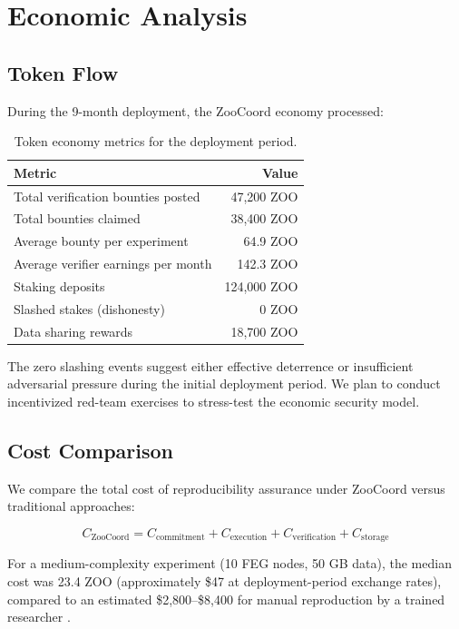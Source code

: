 \section{Economic Analysis}

\label{sec:economics}

\subsection{Token Flow}

During the 9-month deployment, the ZooCoord economy processed:

\begin{table}[H]
\centering
\caption{Token economy metrics for the deployment period.}
\label{tab:economics}
\begin{tabular}{@{}lr@{}}
\toprule
\textbf{Metric} & \textbf{Value} \\
\midrule
Total verification bounties posted & 47,200 ZOO \\
Total bounties claimed & 38,400 ZOO \\
Average bounty per experiment & 64.9 ZOO \\
Average verifier earnings per month & 142.3 ZOO \\
Staking deposits & 124,000 ZOO \\
Slashed stakes (dishonesty) & 0 ZOO \\
Data sharing rewards & 18,700 ZOO \\
\bottomrule
\end{tabular}
\end{table}

The zero slashing events suggest either effective deterrence or insufficient adversarial pressure during the initial deployment period.
We plan to conduct incentivized red-team exercises to stress-test the economic security model.

\subsection{Cost Comparison}

We compare the total cost of reproducibility assurance under ZooCoord versus traditional approaches:

\begin{equation}
    C_{\text{ZooCoord}} = C_{\text{commitment}} + C_{\text{execution}} + C_{\text{verification}} + C_{\text{storage}}
\end{equation}

For a medium-complexity experiment (10 FEG nodes, 50 GB data), the median cost was 23.4 ZOO (approximately \$47 at deployment-period exchange rates), compared to an estimated \$2,800--\$8,400 for manual reproduction by a trained researcher \citep{freedman2015economics}.

